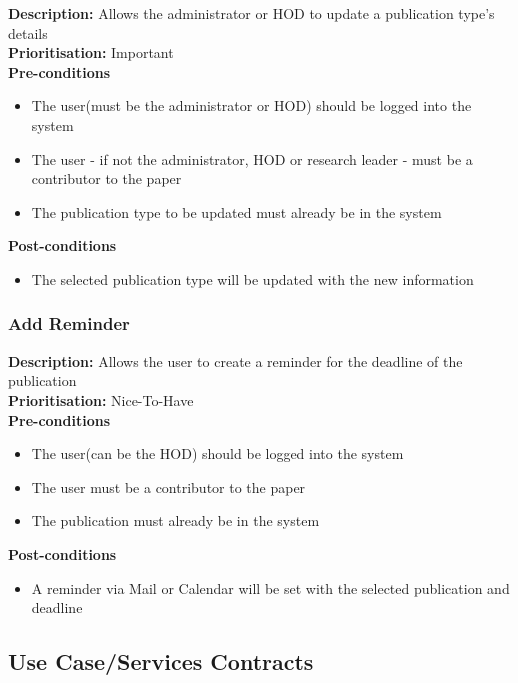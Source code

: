 \documentclass[a4paper]{article}
\begin{document}
    \textbf{Description:} Allows the administrator or HOD to update a publication type's details\\
    \textbf{Prioritisation:} Important\\
    
    
    \textbf{Pre-conditions}
     \begin{itemize}
        \item The user(must be the administrator or HOD) should be logged into the system
        \item The user - if not the administrator, HOD or research leader - must be a contributor to the paper
        \item The publication type to be updated must already be in the system
   \end{itemize}
    
    \textbf{Post-conditions}
    \begin{itemize}
        \item The selected publication type will be updated with the new information
    \end{itemize}
    
    \subsubsection{Add Reminder}
        \textbf{Description:} Allows the user to create a reminder for the deadline of the publication\\
        \textbf{Prioritisation:} Nice-To-Have
        \\
        
        \textbf{Pre-conditions}
        \begin{itemize}
        	\item The user(can be the HOD) should be logged into the system
        	\item The user must be a contributor to the paper
        	\item The publication must already be in the system
        \end{itemize}
        
        \textbf{Post-conditions}
        \begin{itemize}
        	\item A reminder via Mail or Calendar will be set with the selected publication and deadline
        \end{itemize}
    
    
    
	\subsection{Use Case/Services Contracts}
	
\end{document}
